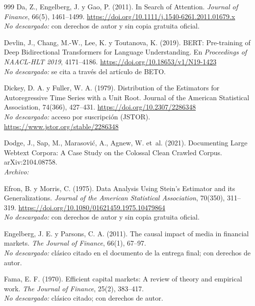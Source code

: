 \begin{thebibliography}{999}
Da, Z., Engelberg, J. y Gao, P. (2011). In Search of Attention. \emph{Journal of Finance}, 66(5), 1461--1499. \url{https://doi.org/10.1111/j.1540-6261.2011.01679.x}
\\\textit{No descargado:} con derechos de autor y sin copia gratuita oficial.

Devlin, J., Chang, M.-W., Lee, K. y Toutanova, K. (2019). {BERT}: Pre-training of Deep Bidirectional Transformers for Language Understanding. En \emph{Proceedings of NAACL-HLT 2019}, 4171--4186. \url{https://doi.org/10.18653/v1/N19-1423}
\\\textit{No descargado:} se cita a través del artículo de BETO.

Dickey, D. A. y Fuller, W. A. (1979). Distribution of the Estimators for Autoregressive Time Series with a Unit Root. Journal of the American Statistical Association, 74(366), 427–431. \url{https://doi.org/10.2307/2286348}
\\\textit{No descargado:} acceso por suscripción (JSTOR). \url{https://www.jstor.org/stable/2286348}

Dodge, J., Sap, M., Marasovi{\'c}, A., Agnew, W. et~al. (2021). Documenting Large Webtext Corpora: A Case Study on the Colossal Clean Crawled Corpus. arXiv:2104.08758.
\\\textit{Archivo:} 

Efron, B. y Morris, C. (1975). Data Analysis Using {Stein}'s Estimator and its Generalizations. \emph{Journal of the American Statistical Association}, 70(350), 311--319. \url{https://doi.org/10.1080/01621459.1975.10479864}
\\\textit{No descargado:} con derechos de autor y sin copia gratuita oficial.

Engelberg, J. E. y Parsons, C. A. (2011). The causal impact of media in financial markets. \emph{The Journal of Finance}, 66(1), 67--97.
\\\textit{No descargado:} clásico citado en el documento de la entrega final; con derechos de autor.

Fama, E. F. (1970). Efficient capital markets: A review of theory and empirical work. \emph{The Journal of Finance}, 25(2), 383--417.
\\\textit{No descargado:} clásico citado; con derechos de autor.


\end{thebibliography}
